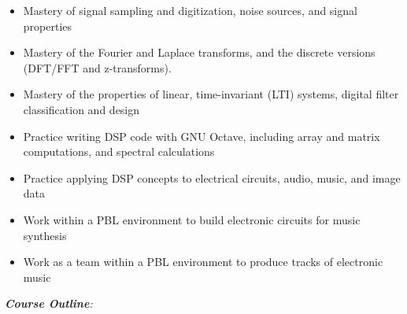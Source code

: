 \documentclass[10pt]{article}
\begin{document}
\begin{itemize}
\item Mastery of signal sampling and digitization, noise sources, and signal properties
\item Mastery of the Fourier and Laplace transforms, and the discrete versions (DFT/FFT and z-transforms).
\item Mastery of the properties of linear, time-invariant (LTI) systems, digital filter classification and design
\item Practice writing DSP code with GNU Octave, including array and matrix computations, and spectral calculations
\item Practice applying DSP concepts to electrical circuits, audio, music, and image data
\item Work within a PBL environment to build electronic circuits for music synthesis
\item Work as a team within a PBL environment to produce tracks of electronic music
\end{itemize}
\clearpage
\twocolumn
\textit{\textbf{Course Outline}:}
\end{document}
